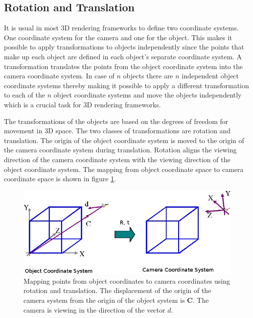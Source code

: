 \documentclass[11pt,a4paper]{report}
\begin{document}
\subsection{Rotation and Translation}
It is usual in most 3D rendering frameworks to define two coordinate systems. One
coordinate system for the camera and one for the object. This makes it possible
to apply transformations to objects independently since the points that make up each object are defined
in each object's separate coordinate system. A transformation translates the points
from the object coordinate system into the camera coordinate system. In case of $n$ objects there are $n$
independent object coordinate systems thereby making it possible to apply a
different transformation to each of the $n$ object coordinate systems and move
the objects independently which is a crucial task for 3D rendering frameworks.

The transformations of the objects are based on the degrees of freedom for
movement in 3D space. The two classes of transformations are rotation and
translation. The origin of the object coordinate system is moved to the origin
of the camera coordinate system during translation. Rotation aligns the viewing direction
of the camera coordinate system with the viewing direction of the object coordinate
system. The mapping from object coordinate space to camera coordinate space
is shown in figure \ref{fg:objCam}.

\begin{figure}[H] 
\centering
\includegraphics[scale=0.55]{images/camera_object5.png}
\caption{ Mapping points from object coordinates to camera coordinates using
  rotation and translation. The displacement of the origin of the camera system
  from the origin of the object system is $\mathbf{C}$. The camera is viewing in
the direction of the vector $d$.}
\label{fg:objCam}
\end{figure}
\end{document}
